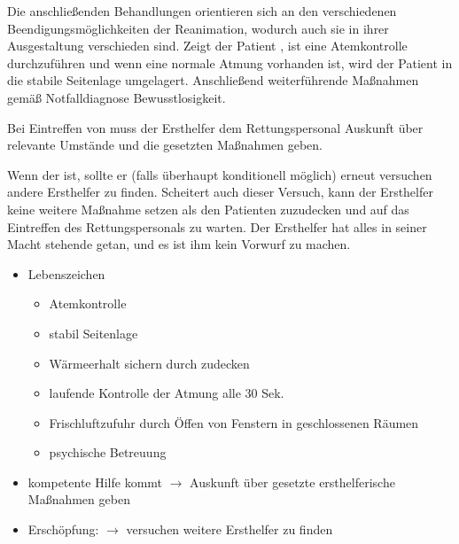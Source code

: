 {
Die anschließenden Behandlungen orientieren sich an den
verschiedenen Beendigungsmöglichkeiten der
Reanimation, wodurch auch sie in ihrer Ausgestaltung verschieden sind. Zeigt
der Patient , ist eine
Atemkontrolle durchzuführen und wenn eine normale Atmung
vorhanden ist, wird der Patient in die stabile Seitenlage umgelagert.
Anschließend weiterführende Maßnahmen gemäß Notfalldiagnose Bewusstlosigkeit. 

Bei Eintreffen von  muss der Ersthelfer
dem Rettungspersonal Auskunft über relevante Umstände und
die gesetzten Maßnahmen geben. 

Wenn der  ist, sollte er (falls überhaupt
konditionell möglich) erneut versuchen andere  Ersthelfer zu
finden. Scheitert auch dieser Versuch, kann der Ersthelfer keine weitere 
Maßnahme setzen als den Patienten zuzudecken und auf das
Eintreffen des  Rettungspersonals zu warten. Der Ersthelfer hat alles
in seiner Macht stehende getan, und es ist ihm kein Vorwurf
zu machen. 
}{
\begin{itemize}
    \item Lebenszeichen
    \begin{itemize}
        \item Atemkontrolle
        \item stabil Seitenlage
        \item Wärmeerhalt sichern durch zudecken
        \item laufende Kontrolle der Atmung alle 30 Sek.
        \item Frischluftzufuhr durch Öffen von Fenstern in geschlossenen Räumen
        \item psychische Betreuung
    \end{itemize}
    \item kompetente Hilfe kommt ${\rightarrow}$ Auskunft über gesetzte
    ersthelferische Maßnahmen geben
    \item Erschöpfung: ${\rightarrow}$ versuchen weitere Ersthelfer zu
    finden
\end{itemize}

}{}{}{}




% 
% 

